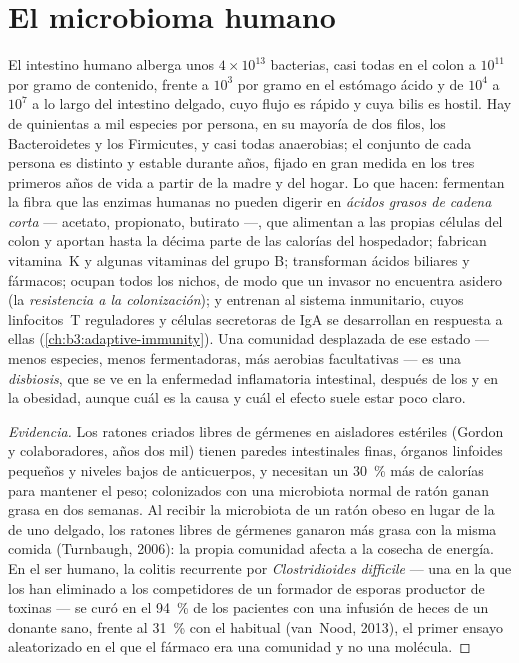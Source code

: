 \section{El microbioma humano}

\begin{definition}\label{def:b3:microbiomes:gut}
El intestino humano alberga unos $4\times 10^{13}$ bacterias, casi todas
en el colon a $10^{11}$ por gramo de contenido, frente a $10^{3}$ por
gramo en el estómago ácido y de $10^{4}$ a $10^{7}$ a lo largo del
intestino delgado, cuyo flujo es rápido y cuya bilis es hostil. Hay de
quinientas a mil especies por persona, en su mayoría de dos filos, los
Bacteroidetes y los Firmicutes, y casi todas anaerobias; el conjunto de
cada persona es distinto y estable durante años, fijado en gran medida en
los tres primeros años de vida a partir de la madre y del hogar. Lo que
hacen: fermentan la fibra que las enzimas humanas no pueden digerir en
\emph{ácidos grasos de cadena corta} --- acetato, propionato, butirato
---, que alimentan a las propias células del colon y aportan hasta la
décima parte de las calorías del hospedador; fabrican vitamina~K y
algunas vitaminas del grupo B; transforman ácidos biliares y fármacos;
ocupan todos los nichos, de modo que un invasor no encuentra asidero (la
\emph{resistencia a la colonización}); y entrenan al sistema inmunitario,
cuyos linfocitos~T reguladores y células secretoras de IgA se desarrollan
en respuesta a ellas (\cref{ch:b3:adaptive-immunity}). Una comunidad
desplazada de ese estado --- menos especies, menos fermentadoras, más
aerobias facultativas --- es una \emph{disbiosis}, que se ve en la
enfermedad inflamatoria intestinal, después de los  y en la
obesidad, aunque cuál es la causa y cuál el efecto suele estar poco
claro.
\end{definition}

\begin{proof}[Evidencia]
Los ratones criados libres de gérmenes en aisladores estériles (Gordon y
colaboradores, años dos mil) tienen paredes intestinales finas, órganos
linfoides pequeños y niveles bajos de anticuerpos, y necesitan un
\qty{30}{\%} más de calorías para mantener el peso; colonizados con una
microbiota normal de ratón ganan grasa en dos semanas. Al recibir la
microbiota de un ratón obeso en lugar de la de uno delgado, los ratones
libres de gérmenes ganaron más grasa con la misma comida (Turnbaugh,
2006): la propia comunidad afecta a la cosecha de energía. En el ser
humano, la colitis recurrente por \emph{Clostridioides difficile} --- una
 en la que los  han eliminado a los competidores de
un formador de esporas productor de toxinas --- se curó en el
\qty{94}{\%} de los pacientes con una infusión de heces de un donante
sano, frente al \qty{31}{\%} con el  habitual (van~Nood,
2013), el primer ensayo aleatorizado en el que el fármaco era una
comunidad y no una molécula.
\end{proof}

